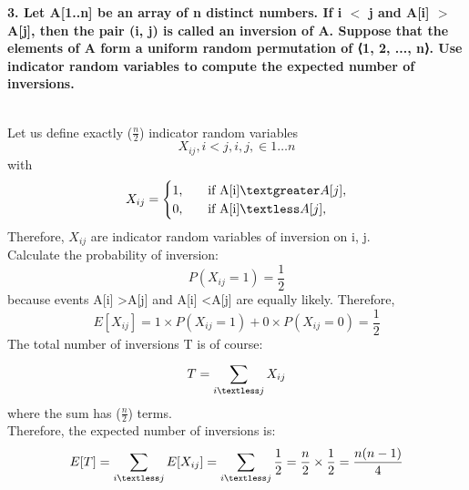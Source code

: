 \documentclass[12pt, letterpaper, twoside]{book}
\begin{document}
\begin{large}
\textbf{3. Let A[1..n] be an array of n distinct numbers. If i $<$ j and A[i] $>$ A[j], then the pair (i, j) is called an inversion of A. Suppose that the elements of A form a uniform random permutation of ⟨1, 2, ..., n⟩. Use indicator random variables to compute the expected number of inversions.}
\end{large}\\
Let us define exactly (\(\frac{n}{2}\)) indicator random variables \[X_{ij},i<j, i,j , \in 1\dots n\] 
with
\[   
X_{ij} = 
     \begin{cases}
       \text{1,} &\quad\text{if A[i]} \textgreater A[j],\\
       \text{0,} &\quad\text{if A[i]} \textless A[j], \\
     \end{cases}
\]
Therefore, \(X_{ij}\) are indicator random variables of inversion on i, j.\\
Calculate the probability of inversion: 
\[P(X_{ij}=1) =\frac{1}{2} \]
because events A[i] \textgreater A[j] and A[i] \textless A[j] are equally likely. Therefore,
\[E[X_{ij}]= 1 \times P(X_{ij}= 1) + 0 \times P(X_{ij}= 0) = \frac{1}{2}\]
The total number of inversions T is of course: 
\[T= \sum_{i\textless j}^{} X_{ij}\]
where the sum has (\(\frac{n}{2}\)) terms.\\
Therefore, the expected number of inversions is: 
\[E[T] = \sum_{i\textless j}^{} E[X_{ij}] = \sum_{i\textless j}^{} \frac{1}{2}= \frac{n}{2} \times \frac{1}{2} =\frac{n(n-1)}{4} \]\\
\end{document}
